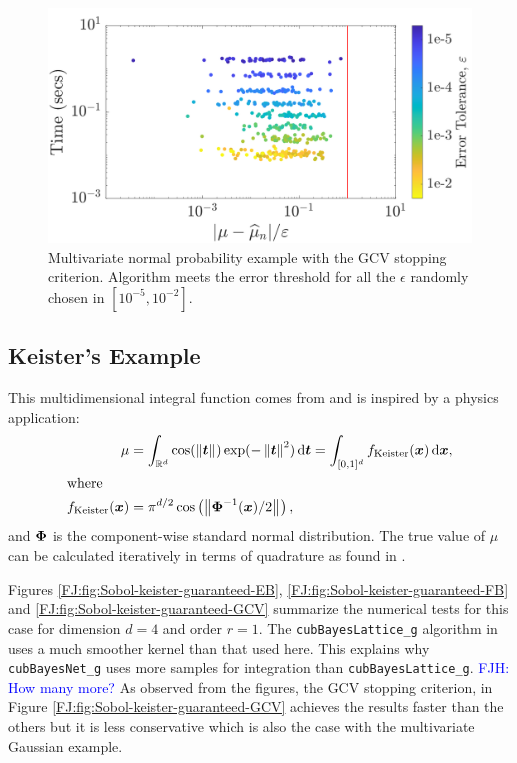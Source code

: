 \documentclass[graybox,footinfo]{svmult}
\newcommand{\norm}[2][{}]{\ensuremath{\left \lVert #2 \right \rVert}_{#1}}
\newcommand{\FJHNote}[1]{{\textcolor{blue}{FJH: #1}}}
\begin{document}
\begin{figure}
\centering
\includegraphics[width=0.95\linewidth]{"figures/Sobol/Sobol_MVN_guaranteed_time_GCV__d2_r1_2019-Sep-1"}
\caption[Sobol: MVN guaranteed: GCV]{Multivariate normal probability example with the GCV stopping criterion. Algorithm meets the error threshold for all the $\epsilon$ randomly chosen in $[10^{-5}, 10^{-2}]$.}
\label{FJ:fig:Sobol-mvn-guaranteed-GCV}
\end{figure}






\subsection{Keister's Example}

This multidimensional integral function comes from \cite{Kei96} and is inspired by a physics application:
\begin{align}
\label{FJ:eqn:keister_integral}
\mu  &=  \int_{\R^d} \cos(\norm{ \bst}) \exp(-\norm{ \bst }^2) \, \textup{d}\bst 
 = \int_{[0,1]^d} f_{\textup{Keister}}(\bsx) \, \textup{d}\bsx,\\
\intertext{where }
\nonumber
f_\textup{Keister}(\bsx) &= \pi^{d/2} \cos\left(\norm{ \bsPhi^{-1}(\bsx)/2}\right)  ,
\end{align}
and ${\boldsymbol{\Phi}}$ is the component-wise standard normal distribution.
The true value of $\mu$ can be calculated iteratively in terms of  quadrature as found in \cite[Section 5.2]{RatHic19a}.


Figures \ref{FJ:fig:Sobol-keister-guaranteed-EB}, \ref{FJ:fig:Sobol-keister-guaranteed-FB} and \ref{FJ:fig:Sobol-keister-guaranteed-GCV} summarize the numerical tests for this case for dimension $d=4$ and order $r=1$.  The \texttt{cubBayesLattice\_g} algorithm in  \cite{RatHic19a} uses a much smoother kernel than that used here. This explains why \texttt{cubBayesNet\_g} uses more samples for integration than  \texttt{cubBayesLattice\_g}. \FJHNote{How many more?}
As observed from the figures, the GCV stopping criterion, in Figure \ref{FJ:fig:Sobol-keister-guaranteed-GCV} achieves the results faster than the others but it is less conservative which is also the case with the multivariate Gaussian example.
\end{document}
